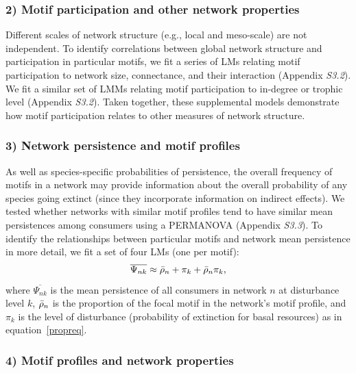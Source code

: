 \documentclass[12pt]{article}
\begin{document}
\begin{spacing}{2.0}
    \subsubsection*{2) Motif participation and other network properties}    
        Different scales of network structure (e.g., local and meso-scale) are not independent. 
        To identify correlations between global network structure and participation in particular motifs, we fit a series of LMs relating motif participation to network size, connectance, and their interaction (Appendix \emph{S3.2}).
        We fit a similar set of  LMMs relating motif participation to in-degree or trophic level (Appendix \emph{S3.2}).
        Taken together, these supplemental models demonstrate how motif participation relates to other measures of network structure.
        
        
    \subsubsection*{3) Network persistence and motif profiles}

        As well as species-specific probabilities of persistence, the overall frequency of motifs in a network may provide information about the overall probability of any species going extinct (since they incorporate information on indirect effects).
        We tested whether networks with similar motif profiles tend to have similar mean persistences among consumers using a PERMANOVA (Appendix \emph{S3.3}).
        To identify the relationships between particular motifs and network mean persistence in more detail, we fit a set of four LMs (one per motif):
            \begin{equation}
                \overline{\Psi_{nk}} \approx \Bar{\rho}_{n} + \pi_{k} + \Bar{\rho}_{n}\pi_{k},
                \label{netpropeq}
            \end{equation}
        \noindent where $\overline{\Psi_{nk}}$ is the mean persistence of all consumers in network $n$ at disturbance level $k$, $\Bar{\rho}_{n}$ is the proportion of the focal motif in the network's motif profile, and $\pi_k$ is the level of disturbance (probability of extinction for basal resources) as in equation~\ref{propreq}.
            
    \subsubsection*{4) Motif profiles and network properties}
    

\end{spacing}
\end{document}
